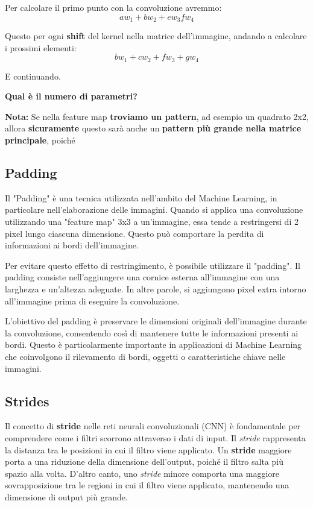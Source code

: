 Per calcolare il primo punto con la convoluzione avremmo:
\begin{equation}
    aw_1 + bw_2 + ew_3 fw_4
\end{equation}

Questo per ogni \textbf{shift} del kernel nella matrice dell'immagine, andando
a calcolare i prossimi elementi:
\begin{equation}
    bw_1 + cw_2 + fw_3 + gw_4
\end{equation}

E continuando.

\textbf{Qual è il numero di parametri?}

\textbf{Nota:} Se nella feature map \textbf{troviamo un pattern}, ad esempio un quadrato 2x2, allora \textbf{sicuramente} questo sarà anche un \textbf{pattern più grande nella matrice principale},
poiché

\subsection{Padding}

Il "Padding" è una tecnica utilizzata nell'ambito del Machine Learning, in
particolare nell'elaborazione delle immagini. Quando si applica una
convoluzione utilizzando una "feature map" 3x3 a un'immagine, essa tende a
restringersi di 2 pixel lungo ciascuna dimensione. Questo può comportare la
perdita di informazioni ai bordi dell'immagine.

Per evitare questo effetto di restringimento, è possibile utilizzare il
"padding". Il padding consiste nell'aggiungere una cornice esterna all'immagine
con una larghezza e un'altezza adeguate. In altre parole, si aggiungono pixel
extra intorno all'immagine prima di eseguire la convoluzione.

L'obiettivo del padding è preservare le dimensioni originali dell'immagine
durante la convoluzione, consentendo così di mantenere tutte le informazioni
presenti ai bordi. Questo è particolarmente importante in applicazioni di
Machine Learning che coinvolgono il rilevamento di bordi, oggetti o
caratteristiche chiave nelle immagini.

\subsection{Strides}

Il concetto di \textbf{stride} nelle reti neurali convoluzionali (CNN) è
fondamentale per comprendere come i filtri scorrono attraverso i dati di input.
Il \textit{stride} rappresenta la distanza tra le posizioni in cui il filtro
viene applicato. Un \textbf{stride} maggiore porta a una riduzione della
dimensione dell'output, poiché il filtro salta più spazio alla volta. D'altro
canto, uno \textit{stride} minore comporta una maggiore sovrapposizione tra le
regioni in cui il filtro viene applicato, mantenendo una dimensione di output
più grande.

